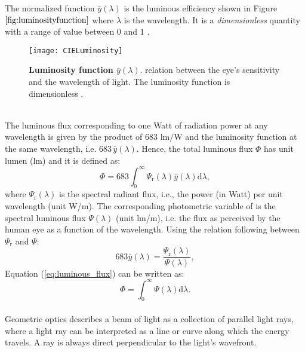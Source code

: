   The normalized function $\bar{y}(\lambda)$ is the luminous efficiency shown in Figure $\ref{fig:luminosityfunction}$ where $\lambda$ is the wavelength. It is a \textit{dimensionless} quantity with a range of value between $0$ and $1$ \cite{schubert2005light}.
\begin{figure}[t]
  \begin{center}
  \texttt{[image: CIELuminosity]}
  \end{center}
  \caption{\textbf{Luminosity function $\bar{y}(\lambda)$}. relation between the eye's sensitivity and the wavelength of light. The luminosity function is dimensionless  \cite{wiki}.}
  \label{fig:luminosityfunction}
  \end{figure}
\\ \indent The luminous flux corresponding to one Watt of radiation power at any wavelength is given by the product of $683$ $\textrm{lm/W}$ and the luminosity function at the same wavelength,
i.e. $683 \, \bar{y}(\lambda)$. Hence, the total luminous flux $\Phi$ has unit lumen (\textrm{lm}) and it is defined as:
\begin{equation}\label{eq:luminous_flux}
\Phi = 683 \int_0^\infty \Psi_\textrm{r}(\lambda) \bar{y}(\lambda)\textrm{d}\lambda,
\end{equation}
where $\Psi_\textrm{r}(\lambda)$ is the spectral radiant flux, i.e., the power (in Watt) per unit wavelength (unit \textrm{W}/\textrm{m}). The corresponding photometric variable of is the spectral luminous flux $\Psi(\lambda)$ (unit \textrm{lm}/\textrm{m}), i.e. the flux as perceived by the human eye as a function of the wavelength. 
Using the relation following between $\Psi_\textrm{r}$ and $\Psi$:
\begin{equation}
683 \bar{y}(\lambda) = \frac{\Psi_\textrm{r}(\lambda)}{\Psi(\lambda)}, 
\end{equation}
Equation (\ref{eq:luminous_flux}) can be written as:
\begin{equation}
\Phi = \int_0^\infty \Psi(\lambda)\textrm{d}\lambda.
\end{equation}
\\ \indent Geometric optics describes a beam of light as a collection of parallel light rays, where a light ray can be interpreted as a line or curve along which the energy travels. A ray is always direct perpendicular to the light's wavefront.  
